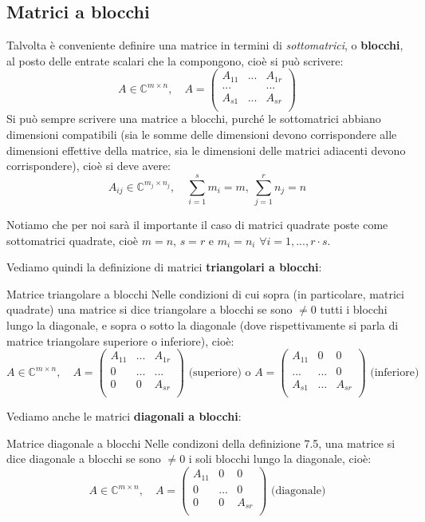 \documentclass[a4paper,11pt]{article}
\begin{document}
\subsection{Matrici a blocchi}
Talvolta è conveniente definire una matrice in termini di \textit{sottomatrici}, o \textbf{blocchi}, al posto delle entrate scalari che la compongono, cioè si può scrivere:
$$
A \in \mathbb{C}^{m \times n}, \quad A = \begin{pmatrix}
	A_{11} & ... & A_{1r} \\
	... & & ... \\
	A_{s1} & ... & A_{sr} \\
\end{pmatrix}
$$
Si può sempre scrivere una matrice a blocchi, purché le sottomatrici abbiano dimensioni compatibili (sia le somme delle dimensioni devono corrispondere alle dimensioni effettive della matrice, sia le dimensioni delle matrici adiacenti devono corrispondere), cioè si deve avere:
$$
A_{ij} \in \mathbb{C}^{m_j \times n_j}, \quad \sum_{i=1}^s m_i = m, \ \sum_{j=1}^r n_j = n
$$

Notiamo che per noi sarà il importante il caso di matrici quadrate poste come sottomatrici quadrate, cioè $m = n$, $s = r$ e $m_i = n_i$ $\forall i = 1, ..., r \cdot s$.

Vediamo quindi la definizione di matrici \textbf{triangolari a blocchi}:
\begin{definition}{Matrice triangolare a blocchi}
	Nelle condizioni di cui sopra (in particolare, matrici quadrate) una matrice si dice triangolare a blocchi se sono $\neq 0$ tutti i blocchi lungo la diagonale, e sopra o sotto la diagonale (dove rispettivamente si parla di matrice triangolare superiore o inferiore), cioè:
$$
A \in \mathbb{C}^{m \times n}, \quad A = \begin{pmatrix}
	A_{11} & ... & A_{1r} \\
	0 & ... & ... \\
	0 & 0 & A_{sr} \\
\end{pmatrix} \text{ (superiore) o }
A = \begin{pmatrix}
	A_{11} & 0 & 0 \\
	... & ... & 0 \\
	A_{s1} & ... & A_{sr} \\
\end{pmatrix} \text{ (inferiore)}
$$
\end{definition}

Vediamo anche le matrici \textbf{diagonali a blocchi}:
\begin{definition}{Matrice diagonale a blocchi}
	Nelle condizoni della definizione 7.5, una matrice si dice diagonale a blocchi se sono $\neq 0$ i soli blocchi lungo la diagonale, cioè:
$$
A \in \mathbb{C}^{m \times n}, \quad A = \begin{pmatrix}
	A_{11} & 0 & 0 \\
	0 & ... & 0 \\
	0 & 0 & A_{sr} \\
\end{pmatrix} \text{ (diagonale)}
$$
\end{definition}
\end{document}
